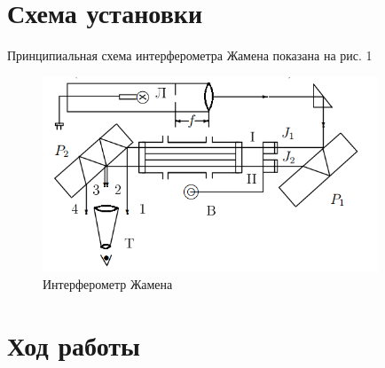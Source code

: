 \documentclass[a4paper]{article}
\begin{document}
\section{Схема установки}

Принципиальная схема интерферометра Жамена показана на рис. 1

    \begin{figure}[h]
    \centering
    \includegraphics[width=10cm]{fig1.PNG}
    \caption{Интерферометр Жамена}
    \label{fig:vac}
\end{figure}

\section{Ход работы}
\end{document}
